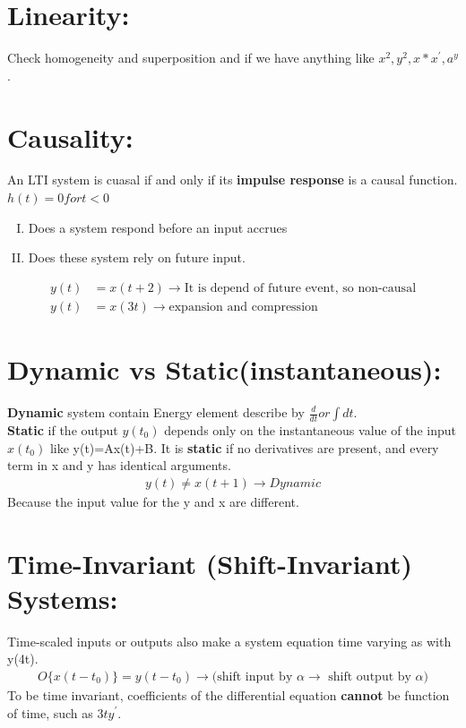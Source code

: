 \documentclass[13pt,a4paper]{article}
\begin{document}
\section{Linearity:}
Check homogeneity and superposition and if we have anything like $x^2, y^2, x*x^{'},a^{y}$.\\

\section{Causality:}
An LTI system is cuasal if and only if its \textbf{impulse response} is a causal function. $h(t)=0 for t<0$
\begin{enumerate}[I)]
    \item Does a system respond before an input accrues\\
    \item Does these system rely on future input.\\
\end{enumerate}
\begin{align*}
     y(t)&=x(t+2)\rightarrow \text{It is depend of future event, so non-causal}\\
    y(t) &=x(3t)\rightarrow \text{expansion and compression}
\end{align*}
\section{Dynamic vs Static(instantaneous):}
\textbf{Dynamic} system contain Energy element describe by $\frac{d}{dt} or \int dt$.\\
\textbf{Static} if the output $y(t_0)$ depends only on the instantaneous value of the input $x(t_0)$ like y(t)=Ax(t)+B. It is \textbf{static} if no derivatives are present, and every term in x and y has identical arguments.\\
\begin{align*}
    y(t)\ne x(t+1)\rightarrow Dynamic
\end{align*}
Because the input value for the y and x are different.
\section{ Time-Invariant (Shift-Invariant) Systems:}
Time-scaled inputs or outputs also make a system equation time varying as with y(4t).
\begin{align*}
    O\{x(t-t_0)\}=y(t-t_0)\rightarrow \text{(shift input by $\alpha \rightarrow$ shift output by $\alpha$)}
\end{align*}
To be time invariant, coefficients of the differential equation \textbf{cannot} be function of time, such as $3ty^{'}$.
\end{document}
